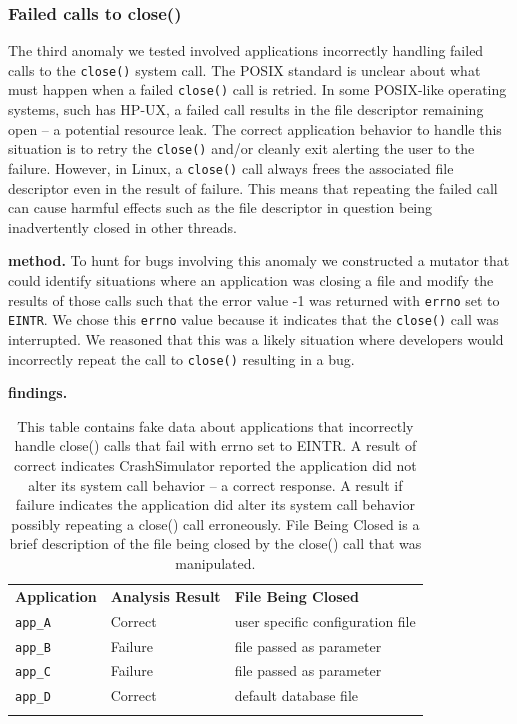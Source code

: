 \subsubsection{Failed calls to close()}
\label{sec-close-failed}

The third anomaly we tested involved applications incorrectly handling
failed calls to the {\tt close()} system call.  The POSIX standard is
unclear about what must happen when a failed {\tt close()} call is
retried.  In some POSIX-like operating systems, such has
HP-UX, a failed call results in the file descriptor remaining open -- a
potential resource leak.  The correct application behavior to handle this
situation is to retry the {\tt close()} and/or cleanly exit alerting the
user to the failure.  However, in Linux, a {\tt close()} call always frees
the associated file descriptor even in the result of failure.  This means
that repeating the failed call can cause harmful effects such as the file
descriptor in question being inadvertently closed in other
threads.

{\bf method.}  To hunt for bugs involving this anomaly we constructed a
mutator that could identify situations where an application was closing a
file and modify the results of those calls such that the error value -1 was
returned with {\tt errno} set to {\tt EINTR}.  We chose this {\tt errno}
value because it indicates that the {\tt close()} call was interrupted.  We
reasoned that this was a likely situation where developers would
incorrectly repeat the call to {\tt close()} resulting in a bug.

{\bf findings.}

\begin{table}[t]
  \scriptsize{}
  \begin{tabular}{l | l | l}
    \toprule{}
      {\bf Application} & {\bf Analysis Result} & {\bf File Being Closed}\\
      {\tt app\_A} & Correct & user specific configuration file\\
      {\tt app\_B} & Failure & file passed as parameter \\
      {\tt app\_C} & Failure & file passed as parameter \\
      {\tt app\_D} & Correct &  default database file\\
    \bottomrule{}
  \end{tabular}
    \caption{This table contains fake data about applications that
    incorrectly handle close() calls that fail with errno set to EINTR.  A
    result of correct indicates CrashSimulator reported  the application
    did not alter its system call behavior -- a correct response.  A result
    if failure indicates the application did alter its system call behavior
    possibly repeating a close() call erroneously.  File Being Closed is a
    brief description of the file being closed by the close() call that was
    manipulated.}
  \label{table:failedclose}
\end{table}

